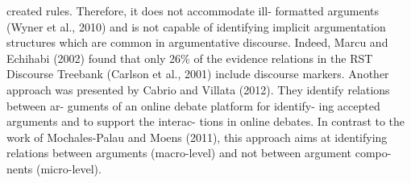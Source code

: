 created rules. Therefore, it does not accommodate ill- formatted arguments (Wyner et al., 2010) and is not capable of identifying implicit argumentation structures which are common in argumentative discourse. Indeed, Marcu and Echihabi (2002) found that only 26\% of the evidence relations in the RST Discourse Treebank (Carlson et al., 2001) include discourse markers. Another approach was presented by Cabrio and Villata (2012). They identify relations between ar- guments of an online debate platform for identify- ing accepted arguments and to support the interac- tions in online debates. In contrast to the work of Mochales-Palau and Moens (2011), this approach aims at identifying relations between arguments (macro-level) and not between argument compo- nents (micro-level).